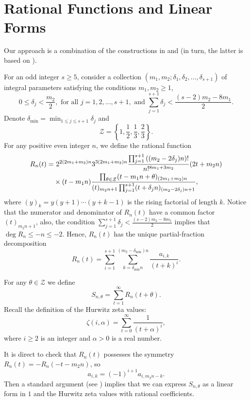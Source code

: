 \documentclass[11pt]{amsart}
\numberwithin{equation}{section}
\begin{document}
\section{Rational Functions and Linear Forms}

Our approach is a combination of the constructions in \cite{Zu04} and \cite{LY20} (in turn, the latter is based on \cite{FSZ19}).

For an odd integer $s \geqslant 5$, consider a collection $(m_1,m_2;\delta_1,\delta_2,\ldots,\delta_{s+1})$ of integral parameters satisfying the conditions $m_1,m_2 \geqslant 1$,
\begin{equation}\label{conditionfordelta}
0 \leqslant \delta_j < \frac{m_2}{2}, \text{~for all~}j=1,2,\ldots,s+1, \text{~and~} \sum_{j=1}^{s+1} \delta_j < \frac{(s-2)m_2 - 8m_1}{2}.
\end{equation}
Denote $\delta_{\min} = \min_{1 \leqslant j \leqslant s+1 } \delta_j$ and
\[ \mathcal{Z} = \left\{ 1,\frac{1}{2},\frac{1}{3},\frac{2}{3} \right\}. \]
For any positive even integer $n$, we define the rational function
\begin{align}\label{R_n(t)}
R_n(t) =& ~ 2^{2(2m_1+m_2)n} 3^{3(2m_1+m_2)n} \frac{\prod_{j=1}^{s+1} \left( (m_2 - 2\delta_j)n \right)!}{n!^{8m_1+3m_2}} (2t+m_2n) \notag \\
& \times (t-m_1n) \frac{\prod_{\theta \in \mathcal{Z}} (t-m_{1}n+\theta)_{(2m_1+m_2)n}}{(t)_{m_{2}n+1}\prod_{j=1}^{s+1}(t+\delta_{j}n)_{(m_2-2\delta_j)n+1}},
\end{align}
where $(y)_{k} = y(y+1)\cdots(y+k-1)$ is the rising factorial of length $k$. Notice that the numerator and denominator of $R_n(t)$ have a common factor $(t)_{m_{2}n+1}$, also, the condition $\sum_{j=1}^{s+1} \delta_j < \frac{(s-2)m_2 - 8m_1}{2}$ implies that $\deg R_n \leqslant -n \leqslant -2$. Hence, $R_n(t)$ has the unique partial-fraction decomposition
\begin{equation}\label{partial_fraction_decomposition}
R_n(t) = \sum_{i=1}^{s+1} \sum_{k = \delta_{\min}n}^{(m_2-\delta_{\min})n} \frac{a_{i,k}}{(t+k)^i}.
\end{equation}

For any $\theta \in \mathcal{Z}$ we define
\[ S_{n,\theta} = \sum_{t = 1}^{\infty} R_n(t+\theta).  \]
Recall the definition of the Hurwitz zeta values:
\[ \zeta(i,\alpha) = \sum_{t=0}^{\infty} \frac{1}{(t+\alpha)^i}, \]
where $i \geqslant 2$ is an integer and $\alpha > 0$ is a real number.

It is direct to check that $R_n(t)$ possesses the symmetry $R_n(t) = -R_n(-t-m_{2}n)$, so
\[ a_{i,k} =  (-1)^{i+1} a_{i,m_{2}n-k}. \]
Then a standard argument (see \cite[Lemma 1]{FSZ19}) implies that we can express $S_{n,\theta}$ as a linear form in $1$ and the Hurwitz zeta values with rational coefficients.
\end{document}
